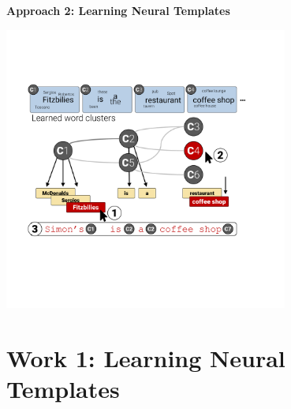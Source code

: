\documentclass[aspectratio=169]{beamer}
\begin{document}
\begin{frame}
  \begin{center}
    \textbf{Approach 2: Learning Neural Templates}
  \end{center}

  \begin{center}
    \includegraphics[width=0.7\textwidth]{DecoderVis}
  \end{center}
\end{frame}

\section{Work 1: Learning Neural Templates}
\end{document}
